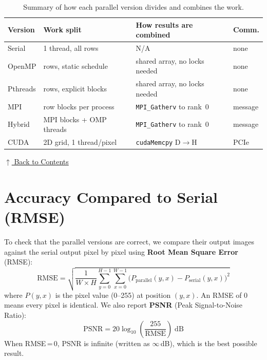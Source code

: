 \documentclass[12pt,a4paper]{article}
\begin{document}
\begin{table}[H]
\centering\small
\renewcommand{\arraystretch}{1.25}
\begin{tabularx}{\textwidth}{@{}l l X l@{}}
\toprule
\textbf{Version} & \textbf{Work split} &
\textbf{How results are combined} & \textbf{Comm.} \\
\midrule
Serial       & 1 thread, all rows       & N/A                              & none \\
OpenMP       & rows, static schedule    & shared array, no locks needed    & none \\
Pthreads     & rows, explicit blocks    & shared array, no locks needed    & none \\
MPI          & row blocks per process   & \texttt{MPI\_Gatherv} to rank~0  & message \\
Hybrid       & MPI blocks + OMP threads & \texttt{MPI\_Gatherv} to rank~0  & message \\
CUDA         & 2D grid, 1 thread/pixel  & \texttt{cudaMemcpy} D$\to$H      & PCIe \\
\bottomrule
\end{tabularx}
\caption{Summary of how each parallel version divides and combines the work.}
\label{tab:strategy}
\end{table}

\hyperref[contents]{\small $\uparrow$ Back to Contents}

\clearpage
\section{Accuracy Compared to Serial (RMSE)}
\label{sec:rmse}

To check that the parallel versions are correct, we compare their output
images against the serial output pixel by pixel using \textbf{Root Mean
Square Error} (RMSE):
\begin{equation}
\mathrm{RMSE} = \sqrt{\frac{1}{W \times H}
  \sum_{y=0}^{H-1} \sum_{x=0}^{W-1}
  \bigl(P_{\text{parallel}}(y,x) - P_{\text{serial}}(y,x)\bigr)^{2}}
\label{eq:rmse}
\end{equation}
where $P(y,x)$ is the pixel value (0--255) at position $(y,x)$. An RMSE of 0
means every pixel is identical. We also report \textbf{PSNR} (Peak
Signal-to-Noise Ratio):
\begin{equation}
\mathrm{PSNR} = 20 \log_{10}\!\left(\frac{255}{\mathrm{RMSE}}\right) \;\text{dB}
\label{eq:psnr}
\end{equation}
When RMSE\,=\,0, PSNR is infinite (written as $\infty$\,dB), which is the
best possible result.
\end{document}
